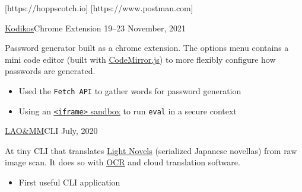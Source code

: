 \documentclass[10pt,a4paper,ragged2e,withhyper]{altacv}
\begin{document}
\begin{paracol}{2}
		[https://hoppscotch.io]
		[https://www.postman.com]



		\cvevent
		{\href{https://github.com/jaacko-torus/kodikos/}{\uline{Kodikos}}{\hr}Chrome Extension}
		{{\CVTagHTMLCSS}{\CVTagJavaScript}}
		{19--23 November, 2021}{}
		\vspace{-0.3cm}
		\begin{justify}
			Password generator built as a chrome extension. The options menu contains a mini code editor (built with \href{https://codemirror.net/}{\uline{CodeMirror.js}}) to more flexibly configure how passwords are generated.
		\end{justify}
		\vspace{-0.2cm}
		\smallskip
		\begin{itemize}
			\item Used the \texttt{Fetch API} to gather words for password generation
			\item Using an \href{https://developer.mozilla.org/en-US/docs/Web/HTTP/Headers/Content-Security-Policy/sandbox/}{\uline{\texttt{<iframe>} sandbox}} to run \texttt{eval} in a secure context
		\end{itemize}

		\divider

		\cvevent
		{\href{https://github.com/jaacko-torus/lao-mm/}{\uline{LAO\&MM}}{\hr}CLI}
		{{\CVTagRuby}{\CVTagOCRA}}
		{July, 2020}{}
		\vspace{-0.3cm}
		\begin{justify}
			At tiny CLI that translates \href{https://en.wikipedia.org/wiki/Light_novel}{\uline{Light Novels}} (serialized Japanese novellas) from raw image scan. It does so with \href{http://capture2text.sourceforge.net/}{\uline{OCR}} and cloud translation software.
		\end{justify}
		\vspace{-0.2cm}
		\smallskip
		\begin{itemize}
			\item First useful CLI application
		\end{itemize}


\end{paracol}
\end{document}
